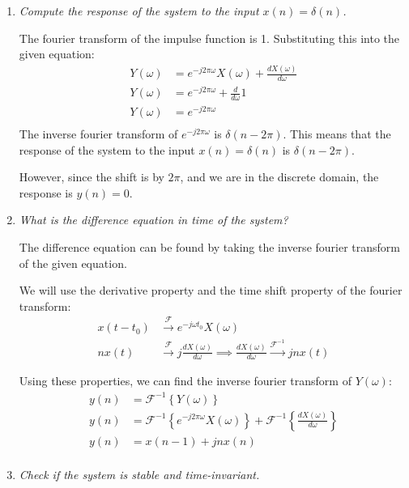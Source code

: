 \documentclass{article}
\begin{document}
\begin{enumerate}[label=(\alph*)]
    \item \textit{Compute the response of the system to the input $x(n) = \delta(n)$.}

    The fourier transform of the impulse function is 1. Substituting this into the given equation:
    \begin{align*}
        Y(\omega) &= e^{-j2\pi \omega}X(\omega) + \frac{dX(\omega)}{d\omega} \\
        Y(\omega) &= e^{-j2\pi \omega} + \frac{d}{d\omega}1 \\
        Y(\omega) &= e^{-j2\pi \omega} \\
    \end{align*}
    The inverse fourier transform of $e^{-j2\pi \omega}$ is $\delta(n-2\pi)$. This means that the response of the system to the input $x(n) = \delta(n)$ is $\boxed{\delta(n-2\pi)}$.
    
    However, since the shift is by $2\pi$, and we are in the discrete domain, the response is $y(n) = 0$.


    \item \textit{What is the difference equation in time of the system?}

    The difference equation can be found by taking the inverse fourier transform of the given equation. 

    We will use the derivative property and the time shift property of the fourier transform:
    \begin{align*}
        x(t-t_0) &\xrightarrow{\mathcal{F}} e^{-j\omega t_0}X(\omega) \\
        nx(t) &\xrightarrow{\mathcal{F}} j \frac{dX(\omega)}{d\omega} \implies \frac{dX(\omega)}{d\omega} \xrightarrow{\mathcal{F}^{-1}} jnx(t)
    \end{align*}

    Using these properties, we can find the inverse fourier transform of $Y(\omega)$:
    \begin{align*}
        y(n) &= \mathcal{F}^{-1}\left\{Y(\omega)\right\} \\
        y(n) &= \mathcal{F}^{-1}\left\{e^{-j2\pi \omega}X(\omega)\right\} + \mathcal{F}^{-1}\left\{\frac{dX(\omega)}{d\omega}\right\} \\
        y(n) &= x(n-1) + jnx(n) \\
    \end{align*}

    \item \textit{Check if the system is stable and time-invariant.}


\end{enumerate}
\end{document}
